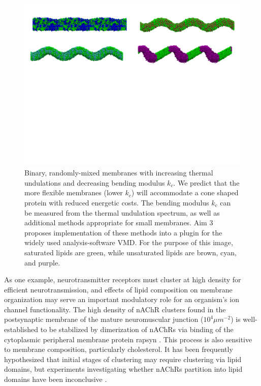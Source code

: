\begin{figure}[t!]
	\includegraphics[width=1\linewidth]{./F31/MultiImageElastic.pdf}
	\caption{ Binary, randomly-mixed membranes with increasing thermal undulations and decreasing bending modulus $k_c$. We predict that the more flexible membranes (lower $k_c$) will accommodate a cone shaped protein with reduced energetic costs. The bending modulus $k_c$ can be measured from the thermal undulation spectrum, as well as additional methods appropriate for small membranes. Aim 3 proposes implementation of these methods into a plugin for the widely used analysis-software VMD. For the purpose of this image, saturated lipids are green, while unsaturated lipids are brown, cyan, and purple.}
	\label{fig:elast}
\end{figure}

As one example, neurotransmitter receptors must cluster at high density for efficient neurotransmission, and effects of lipid composition on membrane organization may serve an important modulatory role for an organism's ion channel functionality. The high density of nAChR clusters found in the postsynaptic membrane of the mature neuromuscular junction ($10^4$$\mu m^{-2}$) is well-established to be stabilized by dimerization of nAChRs via binding of the cytoplasmic peripheral membrane protein rapsyn \cite{Zuber_Structure_2013}. This process is also sensitive to membrane composition, particularly cholesterol. It has been frequently hypothesized \cite{Zhu2006,Bruses2001} that initial stages of clustering may require clustering via lipid domains, but experiments investigating whether nAChRs partition into lipid domains have been inconclusive \cite{Bermdez_Partition_2010,Perillo2016}.

